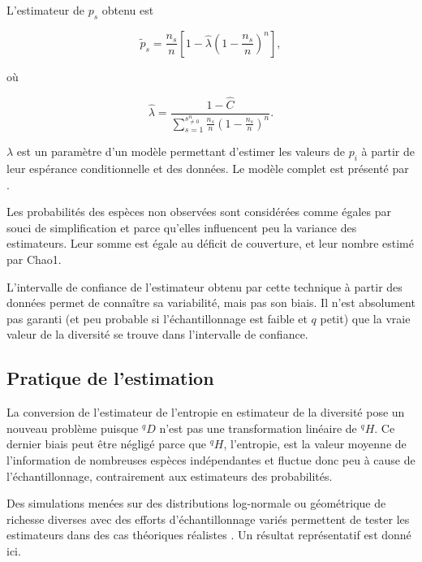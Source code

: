\documentclass[
  11pt,
  french,
  a4paper,
  extrafontsizes,onecolumn,openright
  ]{memoir}
\begin{document}
L'estimateur de \(p_s\) obtenu est

\begin{equation}
  \label{eq:Chao2013ps}
  \tilde{p}_s
  = \frac{n_s}{n} \left[ {1-\hat{\lambda}\left(1-\frac{n_s}{n}\right)^n} \right],
\end{equation}

où

\begin{equation}
  \label{eq:Chao2013lambda}
  \hat{\lambda}
  = \frac{1-\hat{C}}{\sum_{s=1}^{s^{n}_{\ne 0}} {\frac{n_s}{n} \left(1-\frac{n_s}{n}\right)^n}}.
\end{equation}

\(\lambda\) est un paramètre d'un modèle permettant d'estimer les valeurs de \(p_i\) à partir de leur espérance conditionnelle et des données.
Le modèle complet est présenté par \textcite{Chao2014c}.

Les probabilités des espèces non observées sont considérées comme égales par souci de simplification et parce qu'elles influencent peu la variance des estimateurs.
Leur somme est égale au déficit de couverture, et leur nombre estimé par Chao1.

L'intervalle de confiance de l'estimateur obtenu par cette technique à partir des données permet de connaître sa variabilité, mais pas son biais.
Il n'est absolument pas garanti (et peu probable si l'échantillonnage est faible et \(q\) petit) que la vraie valeur de la diversité se trouve dans l'intervalle de confiance.

\subsection{Pratique de l'estimation}\label{pratique-de-lestimation}

La conversion de l'estimateur de l'entropie en estimateur de la diversité pose un nouveau problème puisque \(^{q}\!D\) n'est pas une transformation linéaire de \(^{q}\!H\).
Ce dernier biais peut être négligé \autocite{Grassberger1988} parce que \(^{q}\!H\), l'entropie, est la valeur moyenne de l'information de nombreuses espèces indépendantes et fluctue donc peu à cause de l'échantillonnage, contrairement aux estimateurs des probabilités.

Des simulations menées sur des distributions log-normale ou géométrique de richesse diverses avec des efforts d'échantillonnage variés permettent de tester les estimateurs dans des cas théoriques réalistes \autocite{Marcon2015a}.
Un résultat représentatif est donné ici.
\end{document}
